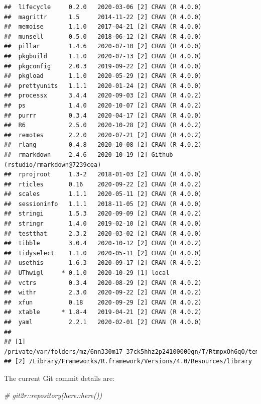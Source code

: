 \documentclass[]{elsarticle} %
\newenvironment{Shaded}{\begin{snugshade}}{\end{snugshade}}
\newcommand{\CommentTok}[1]{\textcolor[rgb]{0.56,0.35,0.01}{\textit{#1}}}
\begin{document}
\begin{verbatim}
##  lifecycle     0.2.0   2020-03-06 [2] CRAN (R 4.0.0)                    
##  magrittr      1.5     2014-11-22 [2] CRAN (R 4.0.0)                    
##  memoise       1.1.0   2017-04-21 [2] CRAN (R 4.0.0)                    
##  munsell       0.5.0   2018-06-12 [2] CRAN (R 4.0.0)                    
##  pillar        1.4.6   2020-07-10 [2] CRAN (R 4.0.0)                    
##  pkgbuild      1.1.0   2020-07-13 [2] CRAN (R 4.0.0)                    
##  pkgconfig     2.0.3   2019-09-22 [2] CRAN (R 4.0.0)                    
##  pkgload       1.1.0   2020-05-29 [2] CRAN (R 4.0.0)                    
##  prettyunits   1.1.1   2020-01-24 [2] CRAN (R 4.0.0)                    
##  processx      3.4.4   2020-09-03 [2] CRAN (R 4.0.2)                    
##  ps            1.4.0   2020-10-07 [2] CRAN (R 4.0.2)                    
##  purrr         0.3.4   2020-04-17 [2] CRAN (R 4.0.0)                    
##  R6            2.5.0   2020-10-28 [2] CRAN (R 4.0.2)                    
##  remotes       2.2.0   2020-07-21 [2] CRAN (R 4.0.2)                    
##  rlang         0.4.8   2020-10-08 [2] CRAN (R 4.0.2)                    
##  rmarkdown     2.4.6   2020-10-19 [2] Github (rstudio/rmarkdown@7239cea)
##  rprojroot     1.3-2   2018-01-03 [2] CRAN (R 4.0.0)                    
##  rticles       0.16    2020-09-22 [2] CRAN (R 4.0.2)                    
##  scales        1.1.1   2020-05-11 [2] CRAN (R 4.0.0)                    
##  sessioninfo   1.1.1   2018-11-05 [2] CRAN (R 4.0.0)                    
##  stringi       1.5.3   2020-09-09 [2] CRAN (R 4.0.2)                    
##  stringr       1.4.0   2019-02-10 [2] CRAN (R 4.0.0)                    
##  testthat      2.3.2   2020-03-02 [2] CRAN (R 4.0.0)                    
##  tibble        3.0.4   2020-10-12 [2] CRAN (R 4.0.2)                    
##  tidyselect    1.1.0   2020-05-11 [2] CRAN (R 4.0.0)                    
##  usethis       1.6.3   2020-09-17 [2] CRAN (R 4.0.2)                    
##  UThwigl     * 0.1.0   2020-10-29 [1] local                             
##  vctrs         0.3.4   2020-08-29 [2] CRAN (R 4.0.2)                    
##  withr         2.3.0   2020-09-22 [2] CRAN (R 4.0.2)                    
##  xfun          0.18    2020-09-29 [2] CRAN (R 4.0.2)                    
##  xtable      * 1.8-4   2019-04-21 [2] CRAN (R 4.0.2)                    
##  yaml          2.2.1   2020-02-01 [2] CRAN (R 4.0.0)                    
## 
## [1] /private/var/folders/mz/6nn330m17_37ck5hhz2p24100000gn/T/RtmpxOh6qO/temp_libpathfd174e3492c1
## [2] /Library/Frameworks/R.framework/Versions/4.0/Resources/library
\end{verbatim}

The current Git commit details are:

\begin{Shaded}
\begin{Highlighting}[]
\CommentTok{\# git2r::repository(here::here())}
\end{Highlighting}
\end{Shaded}
\end{document}
